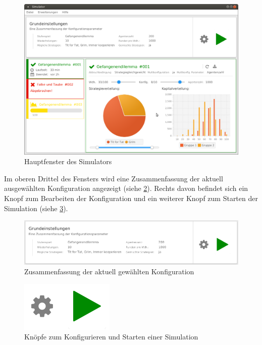 \documentclass[parskip=full,11pt]{scrartcl}
\begin{document}
\begin{figure}[hb]
	\includegraphics[width=\textwidth]{images/home.png}
	\caption{\label{fig:home}
		Hauptfenster des Simulators}
\end{figure}

Im oberen Drittel des Fensters wird eine Zusammenfassung der aktuell ausgewählten Konfiguration angezeigt (siehe \cref{fig:home_top}). Rechts davon befindet sich ein Knopf zum Bearbeiten der Konfiguration und ein weiterer Knopf zum Starten der Simulation (siehe \cref{fig:main_btn}).
 
\begin{figure}[hb]
	\centering
	\includegraphics[width=\textwidth]{images/home_top.png}
	\caption{\label{fig:home_top}
	Zusammenfassung der aktuell gewählten Konfiguration}
\end{figure} 
 
\begin{figure}[ht]
	\centering
 	\includegraphics[width=0.25\linewidth]{images/main_btn.png}
 	\caption{\label{fig:main_btn}
 		Knöpfe zum Konfigurieren und Starten einer Simulation}
\end{figure}
\end{document}
